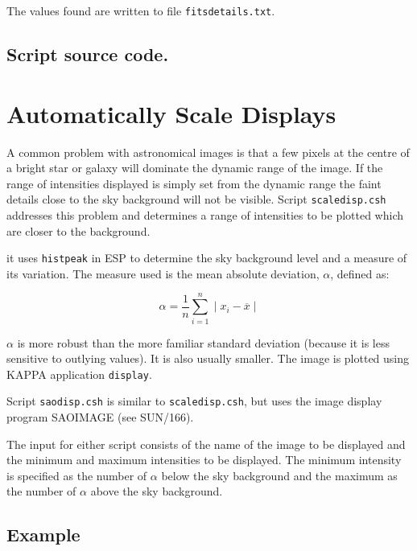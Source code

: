 \documentclass[twoside,11pt]{article}
\newcommand{\htmladdnormallink}[2]{#1}
\newcommand{\xref}[3]{#1}
\newcommand{\xlabel}[1]{}
\begin{document}
The values found are written to file {\tt fitsdetails.txt}.

\begin{htmlonly}
\subsection*{\htmladdnormallink{Script source code.}{fitsinfo.lis}}
\end{htmlonly}


\newpage
\section{\xlabel{SCALEDISP}\label{SCALEDISP}Automatically Scale Displays}

A common problem with astronomical images is that  a few pixels at the
centre of a bright star or galaxy will dominate the dynamic range of
the image.  If the range of intensities displayed is simply set from
the dynamic range the faint details close to the sky background will not
be visible.  Script {\tt scaledisp.csh} addresses this problem and
determines a range of intensities to be plotted which are closer to the
background.

it uses \xref{{\tt histpeak}}{sun180}{SESSION1} in \xref{ESP}{sun180}{}
to determine the sky background level and a measure of its variation.
The measure used is the mean absolute deviation, $\alpha$, defined as:

\begin{equation}
\alpha = \frac{1}{n} \sum_{i=1}^{n} \mid x_{i} - \overline{x} \mid
\end{equation}

$\alpha$ is more robust than the more familiar standard deviation
(because it is less sensitive to outlying values).  It is also usually
smaller.  The image is plotted using KAPPA application
\xref{{\tt display}}{sun95}{DISPLAY}.

Script {\tt saodisp.csh} is similar to {\tt scaledisp.csh}, but uses
the image display program SAOIMAGE (see
\xref{SUN/166}{sun166}{}\/\cite{SUN166}).

The input for either script consists of the name of the image to be
displayed and the minimum and maximum intensities to be displayed.  The
minimum intensity is specified as the number of $\alpha$ below the sky
background and the maximum as the number of $\alpha$ above the sky
background.  

\subsection*{Example}
\end{document}
